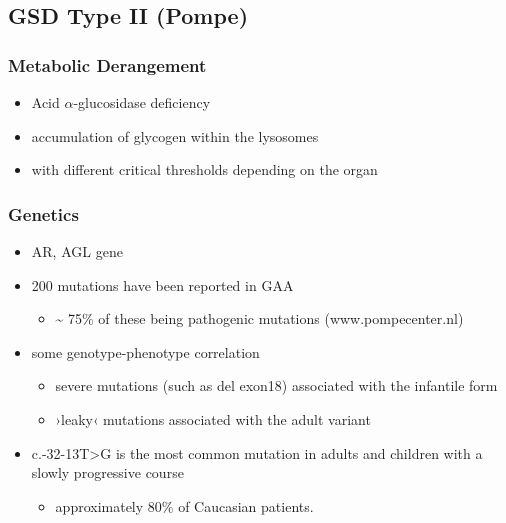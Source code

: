 \documentclass{scrartcl}
\begin{document}
\subsection{GSD Type II (Pompe)}
\label{sec:orgc5c2eff}
\subsubsection{Metabolic Derangement}
\label{sec:org2537aee}
\begin{itemize}
\item Acid \(\alpha\)-glucosidase deficiency
\item accumulation of glycogen within the lysosomes
\item with different critical thresholds depending on the organ
\end{itemize}

\subsubsection{Genetics}
\label{sec:orgeee9e63}
\begin{itemize}
\item AR, AGL gene
\item 200 mutations have been reported in GAA
\begin{itemize}
\item \textasciitilde{} 75\% of these being pathogenic mutations (www.pompecenter.nl)
\end{itemize}
\item some genotype-phenotype correlation
\begin{itemize}
\item severe mutations (such as del exon18) associated with the infantile form
\item ›leaky‹ mutations associated with the adult variant
\end{itemize}
\item c.-32-13T>G is the most common mutation in adults and children with
a slowly progressive course
\begin{itemize}
\item approximately 80\% of Caucasian patients.
\end{itemize}
\end{itemize}
\end{document}
